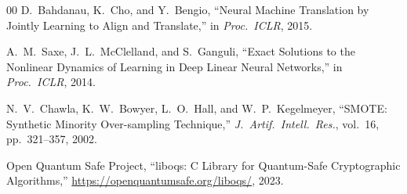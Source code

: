 \documentclass[conference]{IEEEtran}
\begin{document}
\begin{thebibliography}{00}
D.\ Bahdanau, K.\ Cho, and Y.\ Bengio,
``Neural Machine Translation by Jointly Learning to Align and Translate,''
in \textit{Proc.\ ICLR}, 2015.

A.\ M.\ Saxe, J.\ L.\ McClelland, and S.\ Ganguli,
``Exact Solutions to the Nonlinear Dynamics of Learning in Deep Linear
Neural Networks,''
in \textit{Proc.\ ICLR}, 2014.

N.\ V.\ Chawla, K.\ W.\ Bowyer, L.\ O.\ Hall, and W.\ P.\ Kegelmeyer,
``SMOTE: Synthetic Minority Over-sampling Technique,''
\textit{J.\ Artif.\ Intell.\ Res.}, vol.\ 16, pp.\ 321--357, 2002.

Open Quantum Safe Project,
``liboqs: C Library for Quantum-Safe Cryptographic Algorithms,''
\url{https://openquantumsafe.org/liboqs/}, 2023.

\end{thebibliography}
\end{document}

